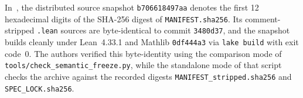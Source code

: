 In~\cite{Lean26}, the distributed source snapshot \texttt{b706618497aa} denotes the first 12 hexadecimal digits of the SHA-256 digest of \texttt{MANIFEST.sha256}. Its comment-stripped \texttt{.lean} sources are byte-identical to commit \texttt{3480d37}, and the snapshot builds cleanly under Lean~4.33.1 and Mathlib \texttt{0df444a3} via \texttt{lake build} with exit code~0. The authors verified this byte-identity using the comparison mode of \texttt{tools/\allowbreak check\_semantic\_freeze.py}, while the standalone mode of that script checks the archive against the recorded digests \texttt{MANIFEST\_\allowbreak stripped.sha256} and \texttt{SPEC\_LOCK.sha256}.
